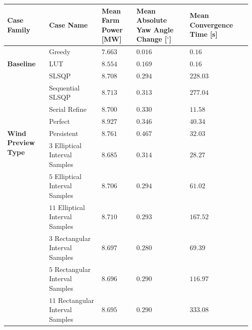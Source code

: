 \begin{tabular}{l|lllll}
\textbf{Case Family} & \textbf{Case Name} & \thead{\textbf{Mean} \\ \textbf{Farm Power [MW]}} & \thead{\textbf{Mean Absolute} \\ \textbf{Yaw Angle Change [$^\circ$]}} & \thead{\textbf{Mean} \\ \textbf{Convergence Time [s]}} \\ \hline 
\multirow{3}{*}{\textbf{Baseline}} & Greedy & $7.663$ \cellcolor[gray]{1.0} & $0.016$ \cellcolor[gray]{1.0} & $0.16$ \cellcolor[gray]{1.0} \\ 
 & LUT & $8.554$  \cellcolor[gray]{0.967} & $0.169$ \cellcolor[gray]{0.967} & $0.16$ \cellcolor[gray]{0.967}  \\ \hline 
\multirow{3}{*}{\textbf{Solver}} & SLSQP & $8.708$ \cellcolor[gray]{0.567} & $0.294$ \cellcolor[gray]{0.667} & $228.03$ \cellcolor[gray]{0.533} \\ 
 & Sequential SLSQP & $8.713$ \cellcolor[gray]{0.467} & $0.313$ \cellcolor[gray]{0.533} & $277.04$ \cellcolor[gray]{0.467}  \\ 
 & Serial Refine & $8.700$  \cellcolor[gray]{0.7} & $0.330$ \cellcolor[gray]{0.467} & $11.58$ \cellcolor[gray]{0.933}  \\ \hline 
\multirow{3}{*}{\textbf{Wind Preview Type}} & Perfect & $8.927$ \cellcolor[gray]{0.4} & $0.346$ \cellcolor[gray]{0.433} & $40.34$ \cellcolor[gray]{0.833} \\ 
 & Persistent & $8.761$ \cellcolor[gray]{0.433} & $0.467$ \cellcolor[gray]{0.4} & $32.03$ \cellcolor[gray]{0.867}  \\ 
 & $3$ Elliptical Interval Samples & $8.685$ \cellcolor[gray]{0.9} & $0.314$ \cellcolor[gray]{0.5} & $28.27$ \cellcolor[gray]{0.9}  \\ 
 & $5$ Elliptical Interval Samples & $8.706$ \cellcolor[gray]{0.633} & $0.294$ \cellcolor[gray]{0.633} & $61.02$ \cellcolor[gray]{0.8}  \\ 
 & $11$ Elliptical Interval Samples & $8.710$ \cellcolor[gray]{0.5} & $0.293$ \cellcolor[gray]{0.733} & $167.52$ \cellcolor[gray]{0.633}  \\ 
 & $3$ Rectangular Interval Samples & $8.697$ \cellcolor[gray]{0.8} & $0.280$ \cellcolor[gray]{0.9} & $69.39$ \cellcolor[gray]{0.767}  \\ 
 & $5$ Rectangular Interval Samples & $8.696$ \cellcolor[gray]{0.833} & $0.290$ \cellcolor[gray]{0.8} & $116.97$ \cellcolor[gray]{0.733}  \\ 
 & $11$ Rectangular Interval Samples & $8.695$ \cellcolor[gray]{0.867} & $0.290$ \cellcolor[gray]{0.833} & $333.08$ \cellcolor[gray]{0.433}  \\ 

\end{tabular}
